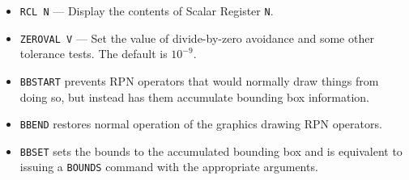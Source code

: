 \documentclass[a4paper,twoside,11pt]{article}
\newcommand{\textttc}[1]{\texttt{\textcolor{OurRed}{#1}}}
\begin{document}
\begin{itemize}
  registers to pass parameters to a procedure.
\item \textttc{RCL N} --- Display the contents of Scalar Register \texttt{N}.
\item \textttc{ZEROVAL V} --- Set the value of divide-by-zero avoidance and some other tolerance tests. The default is $10^{-9}$.
\item \textttc{BBSTART} prevents RPN operators that would normally draw things from doing so, but instead has them accumulate bounding
	box information.
\item \textttc{BBEND} restores normal operation of the graphics drawing RPN operators.
\item \textttc{BBSET} sets the bounds to the accumulated bounding box and is equivalent to issuing a \texttt{BOUNDS} command with the
	appropriate arguments.
\end{itemize}
\end{document}
